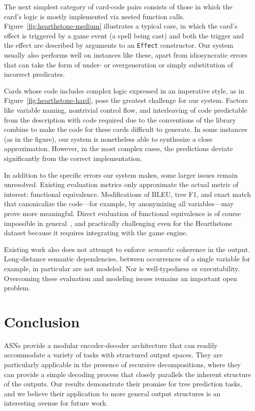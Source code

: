 \documentclass[11pt,a4paper]{article}
\newcommand{\HS}{{\sc Hearthstone}\xspace}
\begin{document}
The next simplest category of card-code pairs consists of those in which the card's logic is mostly implemented via nested function calls. Figure~\ref{fig:hearthstone-medium} illustrates a typical case, in which the card's effect is triggered by a game event (a spell being cast) and both the trigger and the effect are described by arguments to an \texttt{Effect} constructor. Our system usually also performs well on instances like these, apart from idiosyncratic errors that can take the form of under- or overgeneration or simply substitution of incorrect predicates.

Cards whose code includes complex logic expressed in an imperative style, as in Figure~\ref{fig:hearthstone-hard}, pose the greatest challenge for our system. Factors like variable naming, nontrivial control flow, and interleaving of code predictable from the description with code required due to the conventions of the library combine to make the code for these cards difficult to generate. In some instances (as in the figure), our system is nonetheless able to synthesize a close approximation. However, in the most complex cases, the predictions deviate significantly from the correct implementation. 

In addition to the specific errors our system makes, some larger issues remain unresolved. Existing evaluation metrics only approximate the actual metric of interest: functional equivalence. Modifications of BLEU, tree F1, and exact match that canonicalize the code---for example, by anonymizing all variables---may prove more meaningful. Direct evaluation of functional equivalence is of course impossible in general~\citep{Sipser2006Introduction}, and practically challenging even for the \HS dataset because it requires integrating with the game engine. 

Existing work also does not attempt to enforce {\it semantic} coherence in the output. Long-distance semantic dependencies, between occurrences of a single variable for example, in particular are not modeled. Nor is well-typedness or executability. Overcoming these evaluation and modeling issues remains an important open problem.





\section{Conclusion}



ASNs provide a modular encoder-decoder architecture that can readily accommodate a variety of tasks with structured output spaces. They are particularly applicable in the presence of recursive decompositions, where they can provide a simple decoding process that closely parallels the inherent structure of the outputs. Our results demonstrate their promise for tree prediction tasks, and we believe their application to more general output structures is an interesting avenue for future work.
\end{document}
